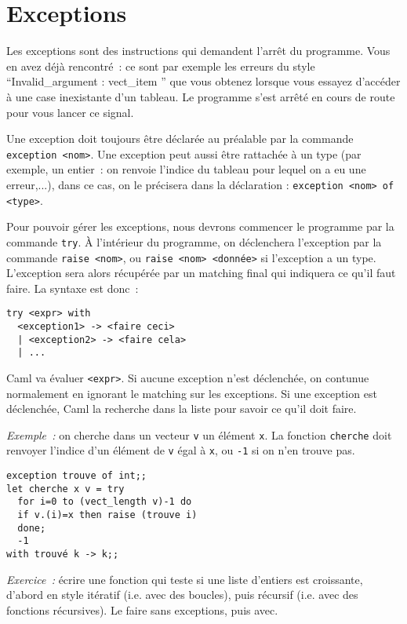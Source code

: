 \documentclass[10pt,a4paper]{article}
\begin{document}
\section{Exceptions}
Les exceptions sont des instructions qui demandent l'arrêt du programme. Vous en avez déjà rencontré~: ce sont par exemple les erreurs du style ``Invalid\_argument : vect\_item '' que vous obtenez lorsque vous essayez d'accéder à une case inexistante d'un tableau. Le programme s'est arrêté en cours de route pour vous lancer ce signal.

Une exception doit toujours être déclarée au préalable par la commande \texttt{exception <nom>}. Une exception peut aussi être rattachée à un type (par exemple, un entier~: on renvoie l'indice du tableau pour lequel on a eu une erreur,...), dans ce cas, on le précisera dans la déclaration : \texttt{exception <nom> of <type>}.

Pour pouvoir gérer les exceptions, nous devrons commencer le programme par la commande \texttt{try}. À l'intérieur du programme, on déclenchera l'exception par la commande \texttt{raise <nom>}, ou \texttt{raise <nom> <donnée>} si l'exception a un type. L'exception sera alors récupérée par un matching final qui indiquera ce qu'il faut faire. La syntaxe est donc~:
\begin{verbatim}try <expr> with
  <exception1> -> <faire ceci>
  | <exception2> -> <faire cela>
  | ...
\end{verbatim}
Caml va évaluer \texttt{<expr>}. Si aucune exception n'est déclenchée, on contunue normalement en ignorant le matching sur les exceptions. Si une exception est déclenchée, Caml la recherche dans la liste pour savoir ce qu'il doit faire.

\emph{Exemple~:} on cherche dans un vecteur \texttt{v} un élément \texttt{x}. La fonction \texttt{cherche} doit renvoyer l'indice d'un élément de \texttt{v} égal à \texttt{x}, ou \texttt{-1} si on n'en trouve pas.
\begin{verbatim}exception trouve of int;;
let cherche x v = try
  for i=0 to (vect_length v)-1 do
  if v.(i)=x then raise (trouve i)
  done;
  -1
with trouvé k -> k;;
\end{verbatim}

\emph{Exercice~:} écrire une fonction qui teste si une liste d'entiers est croissante, d'abord en style itératif (i.e. avec des boucles), puis récursif (i.e. avec des fonctions récursives). Le faire sans exceptions, puis avec.
\end{document}
